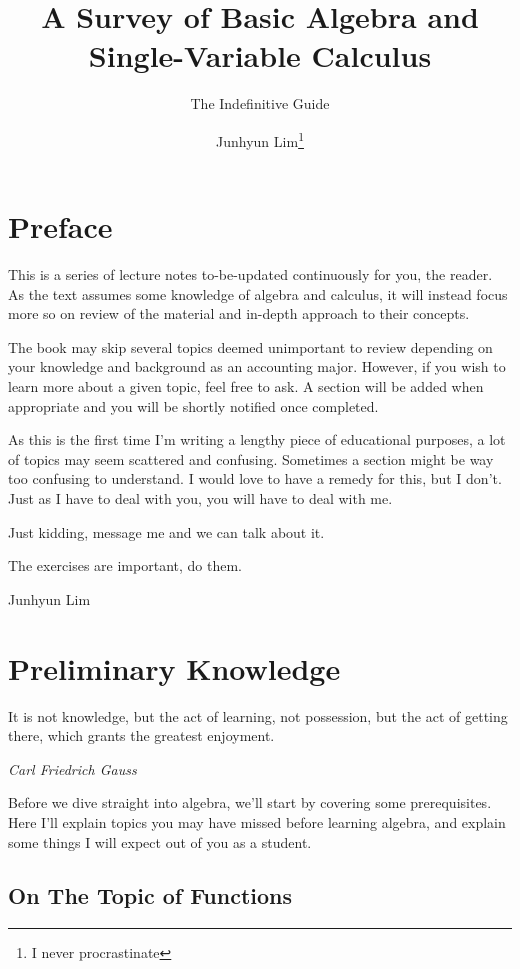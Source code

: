 \documentclass{scrbook}
\title{A Survey of Basic Algebra and Single-Variable Calculus}
\subtitle{The Indefinitive Guide}
\author{Junhyun Lim\thanks{I never procrastinate}}
\theoremstyle{definition}
\begin{document}
\maketitle

\tableofcontents

\chapter*{Preface}

This is a series of lecture notes to-be-updated continuously for you, the reader. As the text assumes some knowledge of algebra and calculus, it will instead focus more so on review of the material and in-depth approach to their concepts. 

The book may skip several topics deemed unimportant to review depending on your knowledge and background as an accounting major. However, if you wish to learn more about a given topic, feel free to ask. A section will be added when appropriate and you will be shortly notified once completed. 

As this is the first time I'm writing a lengthy piece of educational purposes, a lot of topics may seem scattered and confusing. Sometimes a section might be way too confusing to understand. I would love to have a remedy for this, but I don't. Just as I have to deal with you, you will have to deal with me. 

Just kidding, message me and we can talk about it.

The exercises are important, do them.

\vspace{10mm}

Junhyun Lim

\chapter{Preliminary Knowledge}
\epigraph{It is not knowledge, but the act of learning, not possession, but the act of getting there, which grants the greatest enjoyment.}{\textit{Carl Friedrich Gauss}}

Before we dive straight into algebra, we'll start by covering some prerequisites. Here I'll explain topics you may have missed before learning algebra, and explain some things I will expect out of you as a student. 

\section{On The Topic of Functions}
\end{document}
